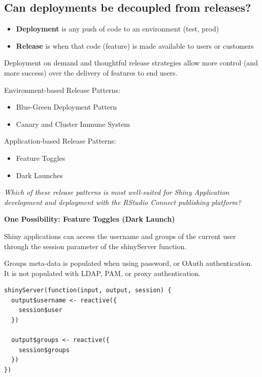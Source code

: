 \documentclass[]{book}
\providecommand{\tightlist}{%
  \setlength{\itemsep}{0pt}\setlength{\parskip}{0pt}}
\theoremstyle{definition}
\theoremstyle{definition}
\theoremstyle{definition}
\theoremstyle{remark}
\begin{document}
\hypertarget{can-deployments-be-decoupled-from-releases}{%
\subsection{Can deployments be decoupled from
releases?}\label{can-deployments-be-decoupled-from-releases}}

\begin{itemize}
\tightlist
\item
  \textbf{Deployment} is any push of code to an environment (test, prod)
\item
  \textbf{Release} is when that code (feature) is made available to
  users or customers
\end{itemize}

Deployment on demand and thoughtful release strategies allow more
control (and more success) over the delivery of features to end users.

Environment-based Release Patterns:

\begin{itemize}
\tightlist
\item
  Blue-Green Deployment Pattern
\item
  Canary and Cluster Immune System
\end{itemize}

Application-based Release Patterns:

\begin{itemize}
\tightlist
\item
  Feature Toggles
\item
  Dark Launches
\end{itemize}

\emph{Which of these release patterns is most well-suited for Shiny
Application development and deployment with the RStudio Connect
publishing platform?}

\textbf{One Possibility: Feature Toggles (Dark Launch)}

Shiny applications can access the username and groups of the current
user through the session parameter of the shinyServer function.

Groups meta-data is populated when using password, or OAuth
authentication. It is not populated with LDAP, PAM, or proxy
authentication.

\begin{verbatim}
shinyServer(function(input, output, session) {
  output$username <- reactive({
    session$user
  })
  
  output$groups <- reactive({
    session$groups
  })
})
\end{verbatim}
\end{document}
